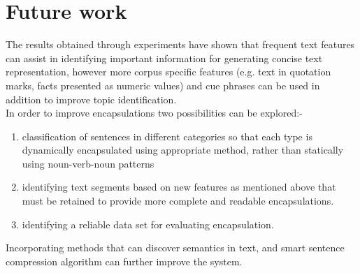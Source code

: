 \section{Future work}
The results obtained through experiments have shown that frequent text features 
can assist in identifying important information for generating concise text 
representation, however more corpus specific features (e.g. text in quotation marks, facts presented as numeric values) and cue phrases can be used in addition to
improve topic identification. \\
In order to improve encapsulations two possibilities can be explored:-
\begin{enumerate}
 \item classification of sentences in different categories so that each type is dynamically encapsulated using appropriate method, rather than statically using
 noun-verb-noun patterns
 \item identifying text segments based on new features as mentioned above that must be retained to provide more complete and readable encapsulations. 
 \item identifying a reliable data set for evaluating encapsulation.
\end{enumerate}
Incorporating methods that can discover semantics in text, and smart sentence compression algorithm can further improve the system.